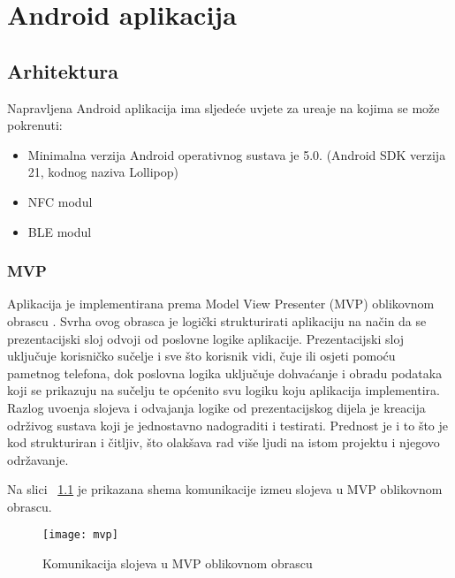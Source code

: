 \chapter{Android aplikacija}

\section{Arhitektura}

Napravljena Android aplikacija ima sljede\'{c}e uvjete za ure\dj aje na kojima se mo\v{z}e pokrenuti:

\begin{itemize}
		\item Minimalna verzija Android operativnog sustava je 5.0. (Android SDK verzija 21, kodnog naziva Lollipop)
		\item NFC modul
		\item BLE modul
\end{itemize}

\subsection{MVP}

Aplikacija je implementirana prema Model View Presenter (MVP) oblikovnom obrascu \cite{mvp}. Svrha ovog obrasca je logi\v{c}ki strukturirati aplikaciju na na\v{c}in da se prezentacijski sloj odvoji od poslovne logike aplikacije. Prezentacijski sloj uklju\v{c}uje korisni\v{c}ko su\v{c}elje i sve \v{s}to korisnik vidi, \v{c}uje ili osjeti pomo\'{c}u pametnog telefona, dok poslovna logika uklju\v{c}uje dohva\'{c}anje i obradu podataka koji se prikazuju na su\v{c}elju te op\'{c}enito svu logiku koju aplikacija implementira. Razlog uvo\dj enja slojeva i odvajanja logike od prezentacijskog dijela je kreacija odr\v{z}ivog sustava koji je jednostavno nadograditi i testirati. Prednost je i to \v{s}to je kod strukturiran i \v{c}itljiv, \v{s}to olak\v{s}ava rad vi\v{s}e ljudi na istom projektu i njegovo odr\v{z}avanje.

Na slici ~\ref{fig:mvp} je prikazana shema komunikacije izme\dj u slojeva u MVP oblikovnom obrascu.

\begin{figure}[!htbp]
	\begin{center}
 \texttt{[image: mvp]}
 \caption{Komunikacija slojeva u MVP oblikovnom obrascu}
 \label{fig:mvp}
	\end{center}
\end{figure}

